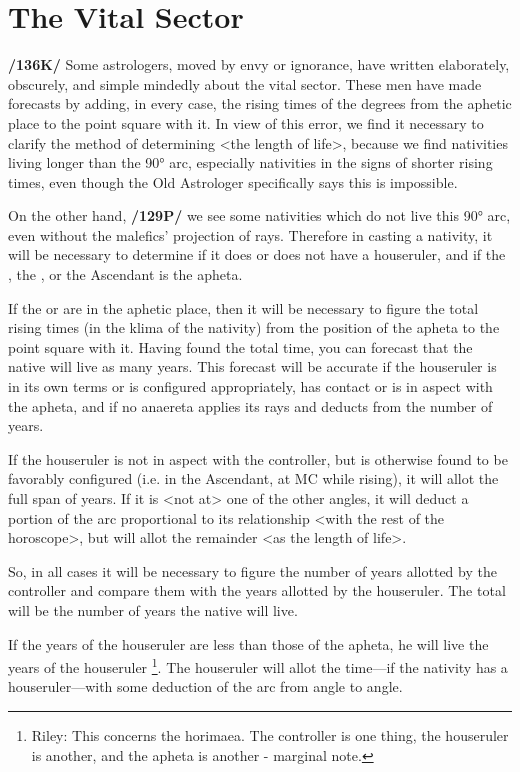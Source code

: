 \section{The Vital Sector}

\textbf{/136K/ }Some astrologers, moved by envy or ignorance, have written elaborately, obscurely, and simple mindedly
about the vital sector. These men have made forecasts by adding, in every case, the rising times of the degrees from the aphetic place to the point square with it. In view of this error, we find it necessary to clarify the method of determining <the length of life>, because we find nativities living longer than the 90° arc, especially nativities in the signs of shorter rising times, even though the Old Astrologer specifically says this is impossible. 

On the other hand, \textbf{/129P/} we see some nativities which do not live this 90° arc, even without the malefics’ projection of rays. Therefore in casting a nativity, it will be necessary to determine if it does or does not have a
houseruler, and if the \Sun, the \Moon, or the Ascendant is the apheta. 

If the \Sun\xspace or \Moon\xspace are in the aphetic
place, then it will be necessary to figure the total rising times (in the klima of the nativity) from the position of the apheta to the point square with it. Having found the total time, you can forecast that the native will live as many years. This forecast will be accurate if the houseruler is in its own terms or is configured appropriately, has contact or is in aspect with the apheta, and if no anaereta applies its rays and deducts from the number of years. 

If the houseruler is not in aspect with the controller, but is otherwise found to be favorably configured (i.e. in the Ascendant, at MC while rising), it will allot the full span of
years. If it is <not at> one of the other angles, it will deduct a portion of the arc proportional to its relationship <with the rest of the horoscope>, but will allot the remainder <as the length of life>.

So, in all cases it will be necessary to figure the number of years allotted by the controller and compare them with the years allotted by the houseruler. The total will be the number of years the native will live.

If the years of the houseruler are less than those of the apheta, he will live the years of the houseruler
\footnote{Riley: This concerns the horimaea. The controller is one thing, the houseruler is another, and the apheta is
another - marginal note.}. The houseruler will allot the time—if the nativity has a houseruler—with some deduction of the arc from angle to angle. 

